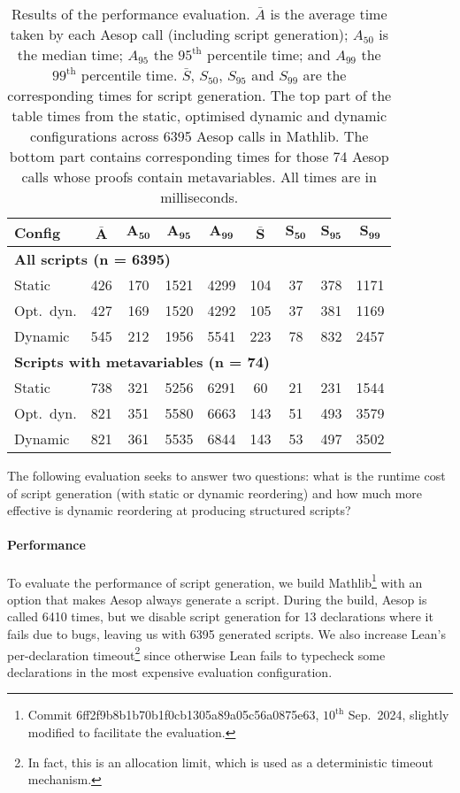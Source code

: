 \documentclass[sigplan,10pt,anonymous,review]{acmart}
\begin{document}
\begin{table}[ht]
  \centering
  \small
  \begin{tabular}{lcccc|cccc}
    \textbf{Config} & $\mathbf{\bar{A}}$ & $\mathbf{A_{50}}$ & $\mathbf{A_{95}}$ & $\mathbf{A_{99}}$ & $\mathbf{\bar{S}}$ & $\mathbf{S_{50}}$ & $\mathbf{S_{95}}$ & $\mathbf{S_{99}}$ \\
    \midrule
    \multicolumn{9}{l}{\textbf{All scripts (n = 6395)}} \\
    Static     & 426 & 170 & 1521 & 4299 & 104 & 37 & 378 & 1171 \\
    Opt.\ dyn. & 427 & 169 & 1520 & 4292 & 105 & 37 & 381 & 1169 \\
    Dynamic    & 545 & 212 & 1956 & 5541 & 223 & 78 & 832 & 2457 \\
    \midrule
    \multicolumn{9}{l}{\textbf{Scripts with metavariables (n = 74)}} \\
    Static     & 738 & 321 & 5256 & 6291 & 60  & 21 & 231 & 1544 \\
    Opt.\ dyn. & 821 & 351 & 5580 & 6663 & 143 & 51 & 493 & 3579 \\
    Dynamic    & 821 & 361 & 5535 & 6844 & 143 & 53 & 497 & 3502 \\
  \end{tabular}
  \medskip
  \caption{Results of the performance evaluation.
    $\bar{A}$ is the average time taken by each Aesop call (including script generation); $A_{50}$ is the median time; $A_{95}$ the $95^{\mathrm{th}}$ percentile time; and $A_{99}$ the $99^{\mathrm{th}}$ percentile time.
    $\bar{S}$, $S_{50}$, $S_{95}$ and $S_{99}$ are the corresponding times for script generation.
    The top part of the table times from the static, optimised dynamic and dynamic configurations across 6395 Aesop calls in Mathlib.
    The bottom part contains corresponding times for those 74 Aesop calls whose proofs contain metavariables.
    All times are in milliseconds.}%
  \label{table:evaluation}
\end{table}

The following evaluation seeks to answer two questions:
what is the runtime cost of script generation (with static or dynamic reordering) and how much more effective is dynamic reordering at producing structured scripts?

\paragraph{Performance}
To evaluate the performance of script generation, we build Mathlib\footnote{Commit 6ff2f9b8b1b70b1f0cb1305a89a05c56a0875e63, $10^{\mathrm{th}}$ Sep.\ 2024, slightly modified to facilitate the evaluation.} with an option that makes Aesop always generate a script.
During the build, Aesop is called 6410 times, but we disable script generation for 13 declarations where it fails due to bugs, leaving us with 6395 generated scripts.
We also increase Lean's per-declaration timeout\footnote{In fact, this is an allocation limit, which is used as a deterministic timeout mechanism.} since otherwise Lean fails to typecheck some declarations in the most expensive evaluation configuration.
\end{document}
